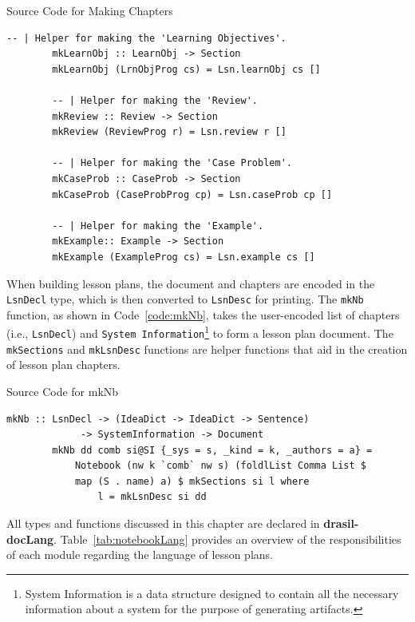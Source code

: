 \begin{listing}[h!]
	\caption{Source Code for Making Chapters} 
	\label{code:mkChapters}
	\begin{lstlisting}[language=haskell1]				
		-- | Helper for making the 'Learning Objectives'.
		mkLearnObj :: LearnObj -> Section
		mkLearnObj (LrnObjProg cs) = Lsn.learnObj cs []
		
		-- | Helper for making the 'Review'.
		mkReview :: Review -> Section
		mkReview (ReviewProg r) = Lsn.review r [] 
		
		-- | Helper for making the 'Case Problem'.
		mkCaseProb :: CaseProb -> Section
		mkCaseProb (CaseProbProg cp) = Lsn.caseProb cp [] 
		
		-- | Helper for making the 'Example'.
		mkExample:: Example -> Section
		mkExample (ExampleProg cs) = Lsn.example cs []
	\end{lstlisting}
\end{listing}

When building lesson plans, the document and chapters are encoded in the 
\texttt{LsnDecl} type, which is then converted to \texttt{LsnDesc} for 
printing. The \texttt{mkNb} function, as shown in Code~\ref{code:mkNb}, takes 
the user-encoded list of chapters (i.e., \texttt{LsnDecl}) and \texttt{System 
Information}\footnote{System Information is a data structure designed to 
contain all the necessary information about a system for the purpose of 
generating artifacts.} to form a lesson plan document. The \texttt{mkSections} 
and \texttt{mkLsnDesc} functions are helper functions that aid in the creation 
of lesson plan chapters.

\begin{listing}[h!]
	\caption{Source Code for mkNb}
	\label{code:mkNb}
	\begin{lstlisting}[language=haskell1]
		mkNb :: LsnDecl -> (IdeaDict -> IdeaDict -> Sentence) 
			 -> SystemInformation -> Document
		mkNb dd comb si@SI {_sys = s, _kind = k, _authors = a} =
			Notebook (nw k `comb` nw s) (foldlList Comma List $ 
			map (S . name) a) $	mkSections si l where
				l = mkLsnDesc si dd
	\end{lstlisting}
\end{listing}

All types and functions discussed in this chapter are declared in 
\textbf{drasil-docLang}. Table~\ref{tab:notebookLang} provides an overview of 
the responsibilities of each module regarding the language of lesson plans.

